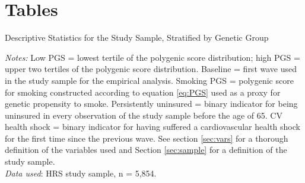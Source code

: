\documentclass[11pt]{article}
\begin{document}
\clearpage
\newpage

\section{Tables}\label{app:tab}

\begin{table}[!ht]
	\caption{Descriptive Statistics for the Study Sample, Stratified by Genetic Group \vspace{-0.3cm}}
	\label{tab:descriptives_full}
		

	{\footnotesize \raggedright \vspace{1ex}
	\textit{Notes:}
	Low PGS = lowest tertile of the polygenic score distribution; high PGS = upper two tertiles of the polygenic score distribution.
	Baseline = first wave used in the study sample for the empirical analysis.
	Smoking PGS = polygenic score for smoking constructed according to equation \ref{eq:PGS} used as a proxy for genetic propensity to smoke.
	Persistently uninsured = binary indicator for being uninsured in every observation of the study sample before the age of 65.
	CV health shock = binary indicator for having suffered a cardiovascular health shock for the first time since the previous wave.
	See section \ref{sec:vars} for a thorough definition of the variables used and Section \ref{sec:sample} for a definition of the study sample. \\
	\textit{Data used}: HRS study sample, n = 5,854.
	\par}
\end{table}
\end{document}
